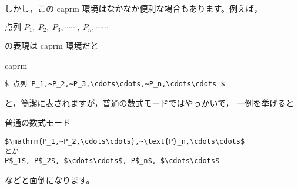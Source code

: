 \documentclass[fleqn,a4j]{jarticle}
\begin{document}
\begin{caprm}
しかし，この \textsf{caprm} 環境はなかなか便利な場合もあります。例えば，

\begin{shadebox}
$ \text{点列 }P_1,~P_2,~P_3,\cdots\cdots,~P_n,\cdots\cdots $
\end{shadebox}

\noindent
の表現は \textsf{caprm} 環境だと

\begin{itembox}{\textsf{caprm}}
\begin{verbatim}
$ 点列 P_1,~P_2,~P_3,\cdots\cdots,~P_n,\cdots\cdots $
\end{verbatim}
\end{itembox}
\end{caprm}
\noindent
と，簡潔に表されますが，普通の数式モードではやっかいで，
一例を挙げると

\begin{itembox}{普通の数式モード}
\begin{verbatim}
$\mathrm{P_1,~P_2,\cdots\cdots},~\text{P}_n,\cdots\cdots$
とか
P$_1$, P$_2$, $\cdots\cdots$, P$_n$, $\cdots\cdots$
\end{verbatim}
\end{itembox}

\noindent
などと面倒になります。
\end{document}
